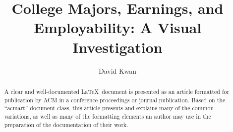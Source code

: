 \documentclass[sigchi]{acmart}
\begin{document}
\title{College Majors, Earnings, and Employability: A Visual Investigation}

\author{David Kwan}


\begin{abstract}
  A clear and well-documented \LaTeX\ document is presented as an
  article formatted for publication by ACM in a conference proceedings
  or journal publication. Based on the ``acmart'' document class, this
  article presents and explains many of the common variations, as well
  as many of the formatting elements an author may use in the
  preparation of the documentation of their work.
\end{abstract}

\end{document}
